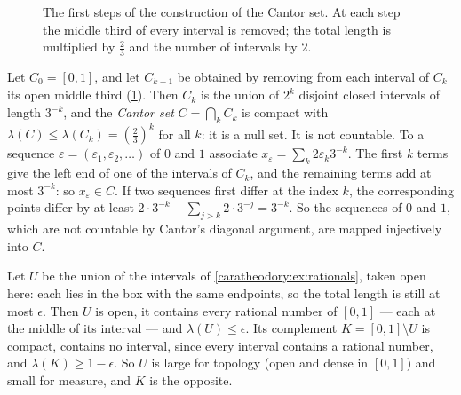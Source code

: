 \begin{notechapter}
\begin{figure}[ht]
\centering
{}
\caption{The first steps of the construction of the Cantor set. At each
step the middle third of every interval is removed; the total length is
multiplied by $\frac23$ and the number of intervals by $2$.}
\label{caratheodory:fig:cantor}
\end{figure}

\begin{example}\label{caratheodory:ex:cantor}
Let $C_0 = [0, 1]$, and let $C_{k+1}$ be obtained by removing from each
interval of $C_k$ its open middle third
(\cref{caratheodory:fig:cantor}). Then $C_k$ is the union of $2^k$
disjoint closed intervals of length $3^{-k}$, and the \emph{Cantor set}
$C = \bigcap_kC_k$ is compact with
$\lambda(C)\leq\lambda(C_k) = (\frac23)^k$ for all $k$: it is a null
set. It is not countable. To a sequence
$\varepsilon = (\varepsilon_1, \varepsilon_2, \dots)$ of $0$ and $1$
associate $x_\varepsilon = \sum_k2\varepsilon_k3^{-k}$. The first $k$
terms give the left end of one of the intervals of $C_k$, and the
remaining terms add at most $3^{-k}$: so $x_\varepsilon\in C$. If two
sequences first differ at the index $k$, the corresponding points
differ by at least
$2\cdot3^{-k} - \sum_{j>k}2\cdot3^{-j} = 3^{-k}$. So the sequences of
$0$ and $1$, which are not countable by Cantor's diagonal argument,
are mapped injectively into $C$.
\end{example}

\begin{example}
\label{caratheodory:ex:dense}
Let $U$ be the union of the intervals of
\cref{caratheodory:ex:rationals}, taken open here: each lies in the box
with the same endpoints, so the total length is still at most
$\epsilon$. Then $U$ is open, it contains every rational number of
$[0, 1]$ --- each at the middle of its interval --- and
$\lambda(U)\leq\epsilon$. Its
complement $K = [0, 1]\setminus U$ is compact, contains no interval,
since every interval contains a rational number, and
$\lambda(K)\geq1 - \epsilon$. So $U$ is large for topology (open and
dense in $[0, 1]$) and small for measure, and $K$ is the opposite.


\end{example}
\end{notechapter}
